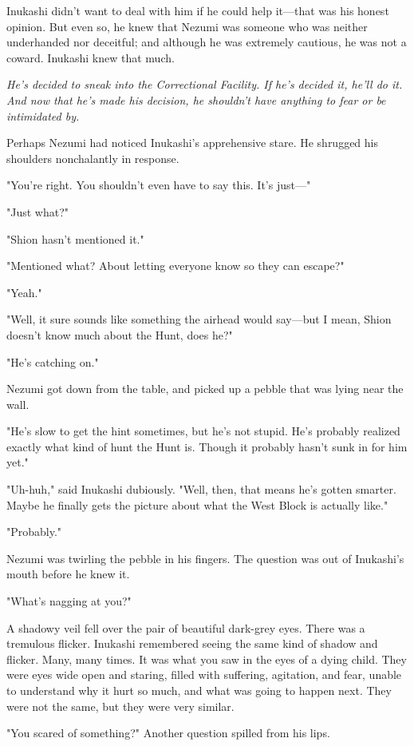 Inukashi didn't want to deal with him if he could help it---that was his
honest opinion. But even so, he knew that Nezumi was someone who was
neither underhanded nor deceitful; and although he was extremely
cautious, he was not a coward. Inukashi knew that much.

\emph{He's decided to sneak into the Correctional Facility. If he's decided
it, he'll do it. And now that he's made his decision, he shouldn't have
anything to fear or be intimidated by.}

Perhaps Nezumi had noticed Inukashi's apprehensive stare. He shrug\-ged
his shoulders nonchalantly in response.

"You're right. You shouldn't even have to say this. It's just---"

"Just what?"

"Shion hasn't mentioned it."

"Mentioned what? About letting everyone know so they can escape?"

"Yeah."

"Well, it sure sounds like something the airhead would say---but I mean,
Shion doesn't know much about the Hunt, does he?"

"He's catching on."

Nezumi got down from the table, and picked up a pebble that was lying
near the wall.

"He's slow to get the hint sometimes, but he's not stupid. He's probably
realized exactly what kind of hunt the Hunt is. Though it probably
hasn't sunk in for him yet."

"Uh-huh," said Inukashi dubiously. "Well, then, that means he's gotten
smarter. Maybe he finally gets the picture about what the West Block is
actually like."

"Probably."

Nezumi was twirling the pebble in his fingers. The question was out of
Inukashi's mouth before he knew it.

"What's nagging at you?"

A shadowy veil fell over the pair of beautiful dark-grey eyes. There was
a tremulous flicker. Inukashi remembered seeing the same kind of shadow
and flicker. Many, many times. It was what you saw in the eyes of a
dying child. They were eyes wide open and staring, filled with
suffering, agitation, and fear, unable to understand why it hurt so
much, and what was going to happen next. They were not the same, but
they were very similar.

"You scared of something?" Another question spilled from his lips.

